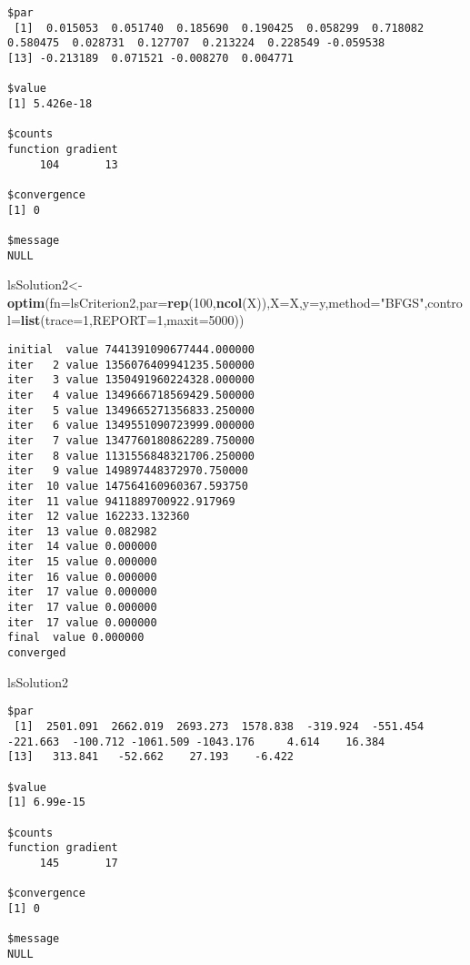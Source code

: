 \documentclass[10pt,]{article}
\newenvironment{Shaded}{\begin{snugshade}}{\end{snugshade}}
\newcommand{\KeywordTok}[1]{\textcolor[rgb]{0.13,0.29,0.53}{\textbf{{#1}}}}
\newcommand{\DataTypeTok}[1]{\textcolor[rgb]{0.13,0.29,0.53}{{#1}}}
\newcommand{\DecValTok}[1]{\textcolor[rgb]{0.00,0.00,0.81}{{#1}}}
\newcommand{\StringTok}[1]{\textcolor[rgb]{0.31,0.60,0.02}{{#1}}}
\newcommand{\NormalTok}[1]{{#1}}
\begin{document}
\begin{verbatim}
$par
 [1]  0.015053  0.051740  0.185690  0.190425  0.058299  0.718082  0.580475  0.028731  0.127707  0.213224  0.228549 -0.059538
[13] -0.213189  0.071521 -0.008270  0.004771

$value
[1] 5.426e-18

$counts
function gradient 
     104       13 

$convergence
[1] 0

$message
NULL
\end{verbatim}

\begin{Shaded}
\begin{Highlighting}[]
\NormalTok{lsSolution2<-}\KeywordTok{optim}\NormalTok{(}\DataTypeTok{fn=}\NormalTok{lsCriterion2,}\DataTypeTok{par=}\KeywordTok{rep}\NormalTok{(}\DecValTok{100}\NormalTok{,}\KeywordTok{ncol}\NormalTok{(X)),}\DataTypeTok{X=}\NormalTok{X,}\DataTypeTok{y=}\NormalTok{y,}\DataTypeTok{method=}\StringTok{"BFGS"}\NormalTok{,}\DataTypeTok{control=}\KeywordTok{list}\NormalTok{(}\DataTypeTok{trace=}\DecValTok{1}\NormalTok{,}\DataTypeTok{REPORT=}\DecValTok{1}\NormalTok{,}\DataTypeTok{maxit=}\DecValTok{5000}\NormalTok{))}
\end{Highlighting}
\end{Shaded}

\begin{verbatim}
initial  value 7441391090677444.000000 
iter   2 value 1356076409941235.500000
iter   3 value 1350491960224328.000000
iter   4 value 1349666718569429.500000
iter   5 value 1349665271356833.250000
iter   6 value 1349551090723999.000000
iter   7 value 1347760180862289.750000
iter   8 value 1131556848321706.250000
iter   9 value 149897448372970.750000
iter  10 value 147564160960367.593750
iter  11 value 9411889700922.917969
iter  12 value 162233.132360
iter  13 value 0.082982
iter  14 value 0.000000
iter  15 value 0.000000
iter  16 value 0.000000
iter  17 value 0.000000
iter  17 value 0.000000
iter  17 value 0.000000
final  value 0.000000 
converged
\end{verbatim}

\begin{Shaded}
\begin{Highlighting}[]
\NormalTok{lsSolution2}
\end{Highlighting}
\end{Shaded}

\begin{verbatim}
$par
 [1]  2501.091  2662.019  2693.273  1578.838  -319.924  -551.454  -221.663  -100.712 -1061.509 -1043.176     4.614    16.384
[13]   313.841   -52.662    27.193    -6.422

$value
[1] 6.99e-15

$counts
function gradient 
     145       17 

$convergence
[1] 0

$message
NULL
\end{verbatim}
\end{document}
